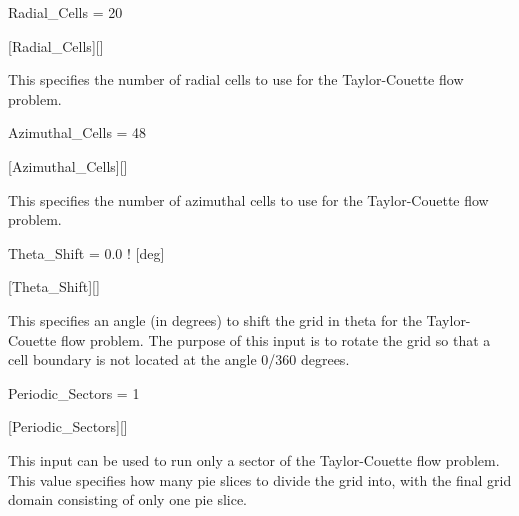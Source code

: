 
\FINALFIX{\newpage}
\begin{nmldescitem}
Radial_Cells = 20
\end{nmldescitem}
[Radial\_Cells][]

\begin{nmldescbody}
This specifies the number of radial cells to use for the Taylor-Couette flow
problem.
\end{nmldescbody}


\begin{nmldescitem}
Azimuthal_Cells = 48
\end{nmldescitem}
[Azimuthal\_Cells][]

\begin{nmldescbody}
This specifies the number of azimuthal cells to use for the Taylor-Couette
flow problem.
\end{nmldescbody}


\begin{nmldescitem}
Theta_Shift = 0.0  ! [deg]
\end{nmldescitem}
[Theta\_Shift][]

\begin{nmldescbody}
This specifies an angle (in degrees) to shift the grid in theta for the
Taylor-Couette flow problem. The purpose of this input is to rotate the grid
so that a cell boundary is not located at the angle 0\slash 360 degrees.
\end{nmldescbody}


\begin{nmldescitem}
Periodic_Sectors = 1
\end{nmldescitem}
[Periodic\_Sectors][]

\begin{nmldescbody}
This input can be used to run only a sector of the Taylor-Couette flow
problem. This value specifies how many pie slices to divide the grid into,
with the final grid domain consisting of only one pie slice.
\end{nmldescbody}


